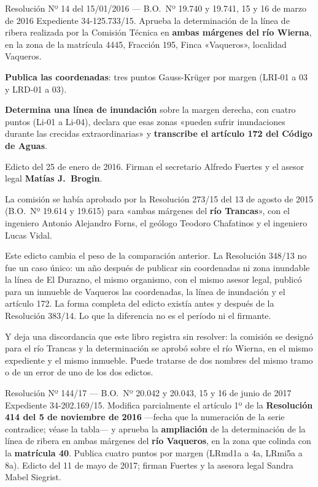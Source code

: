\begin{ficha}{Resolución Nº 14 del 15/01/2016 --- B.O.\ Nº 19.740 y 19.741, 15 y 16 de marzo de 2016}
Expediente 34-125.733/15. Aprueba la determinación de la línea de ribera realizada por la Comisión Técnica en \textbf{ambas márgenes del río Wierna}, en la zona de la matrícula 4445, Fracción 195, Finca «Vaqueros», localidad Vaqueros.

\textbf{Publica las coordenadas}: tres puntos Gauss-Krüger por margen (LRI-01 a 03 y LRD-01 a 03).

\textbf{Determina una línea de inundación} sobre la margen derecha, con cuatro puntos (Li-01 a Li-04), declara que esas zonas «pueden sufrir inundaciones durante las crecidas extraordinarias» y \textbf{transcribe el artículo 172 del Código de Aguas}.

Edicto del 25 de enero de 2016. Firman el secretario Alfredo Fuertes y el asesor legal \textbf{Matías J.\ Brogin}.

La comisión se había aprobado por la Resolución 273/15 del 13 de agosto de 2015 (B.O.\ Nº 19.614 y 19.615) para «ambas márgenes del \textbf{río Trancas}», con el ingeniero Antonio Alejandro Forns, el geólogo Teodoro Chafatinos y el ingeniero Lucas Vidal.
\end{ficha}

\begin{cautela}
Este edicto cambia el peso de la comparación anterior. La Resolución 348/13 no fue un caso único: un año después de publicar sin coordenadas ni zona inundable la línea de El Durazno, el mismo organismo, con el mismo asesor legal, publicó para un inmueble de Vaqueros las coordenadas, la línea de inundación y el artículo 172. La forma completa del edicto existía antes y después de la Resolución 383/14. Lo que la diferencia no es el período ni el firmante.

Y deja una discordancia que este libro registra sin resolver: la comisión se designó para el río Trancas y la determinación se aprobó sobre el río Wierna, en el mismo expediente y el mismo inmueble. Puede tratarse de dos nombres del mismo tramo o de un error de uno de los dos edictos. 
\end{cautela}

\begin{ficha}{Resolución Nº 144/17 --- B.O.\ Nº 20.042 y 20.043, 15 y 16 de junio de 2017}
Expediente 34-202.169/15. Modifica parcialmente el artículo 1º de la \textbf{Resolución 414 del 5 de noviembre de 2016} ---fecha que la numeración de la serie contradice; véase la tabla--- y aprueba la \textbf{ampliación} de la determinación de la línea de ribera en ambas márgenes del \textbf{río Vaqueros}, en la zona que colinda con la \textbf{matrícula 40}. Publica cuatro puntos por margen (LRmd1a a 4a, LRmi5a a 8a). Edicto del 11 de mayo de 2017; firman Fuertes y la asesora legal Sandra Mabel Siegrist.
\end{ficha}

